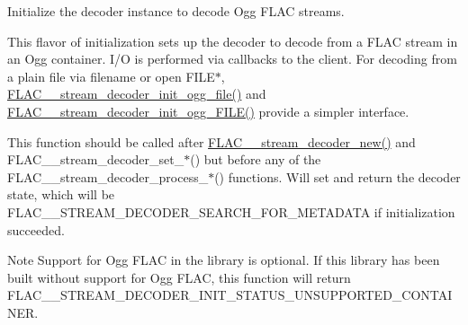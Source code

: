 Initialize the decoder instance to decode Ogg F\+L\+AC streams.

This flavor of initialization sets up the decoder to decode from a F\+L\+AC stream in an Ogg container. I/O is performed via callbacks to the client. For decoding from a plain file via filename or open F\+I\+L\+E$\ast$, \hyperlink{group__flac__stream__decoder_ga609f2a43987d6abeaef654575462030c}{F\+L\+A\+C\+\_\+\+\_\+stream\+\_\+decoder\+\_\+init\+\_\+ogg\+\_\+file()} and \hyperlink{group__flac__stream__decoder_gac6a35b1db07e057ec9912f637b37dd74}{F\+L\+A\+C\+\_\+\+\_\+stream\+\_\+decoder\+\_\+init\+\_\+ogg\+\_\+\+F\+I\+L\+E()} provide a simpler interface.

This function should be called after \hyperlink{group__flac__stream__decoder_ga7159eefc074dfbab4a37462f69326091}{F\+L\+A\+C\+\_\+\+\_\+stream\+\_\+decoder\+\_\+new()} and F\+L\+A\+C\+\_\+\+\_\+stream\+\_\+decoder\+\_\+set\+\_\+$\ast$() but before any of the F\+L\+A\+C\+\_\+\+\_\+stream\+\_\+decoder\+\_\+process\+\_\+$\ast$() functions. Will set and return the decoder state, which will be F\+L\+A\+C\+\_\+\+\_\+\+S\+T\+R\+E\+A\+M\+\_\+\+D\+E\+C\+O\+D\+E\+R\+\_\+\+S\+E\+A\+R\+C\+H\+\_\+\+F\+O\+R\+\_\+\+M\+E\+T\+A\+D\+A\+TA if initialization succeeded.

\begin{DoxyNote}{Note}
Support for Ogg F\+L\+AC in the library is optional. If this library has been built without support for Ogg F\+L\+AC, this function will return {\ttfamily F\+L\+A\+C\+\_\+\+\_\+\+S\+T\+R\+E\+A\+M\+\_\+\+D\+E\+C\+O\+D\+E\+R\+\_\+\+I\+N\+I\+T\+\_\+\+S\+T\+A\+T\+U\+S\+\_\+\+U\+N\+S\+U\+P\+P\+O\+R\+T\+E\+D\+\_\+\+C\+O\+N\+T\+A\+I\+N\+ER}.
\end{DoxyNote}


